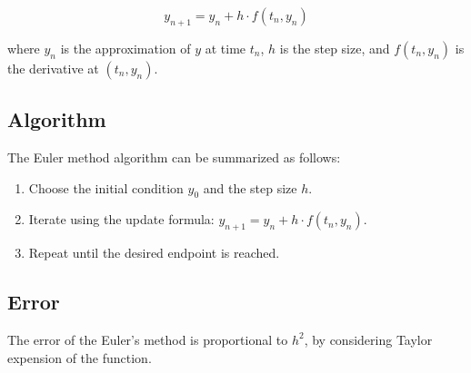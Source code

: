\documentclass[french,12pt,a4paper]{book}
\numberwithin{equation}{chapter}
\begin{document}
\[ y_{n+1} = y_n + h \cdot f(t_n, y_n) \]

where \( y_n \) is the approximation of \( y \) at time \( t_n \), \( h \) is the step size, and \( f(t_n, y_n) \) is the derivative at \( (t_n, y_n) \).

\subsection{Algorithm}

The Euler method algorithm can be summarized as follows:

\begin{enumerate}
    \item Choose the initial condition \( y_0 \) and the step size \( h \).
    \item Iterate using the update formula: \( y_{n+1} = y_n + h \cdot f(t_n, y_n) \).
    \item Repeat until the desired endpoint is reached.
\end{enumerate}

\subsection{Error}

The error of the Euler's method is proportional to $h^2$, by considering Taylor expension of the function. 
\end{document}
